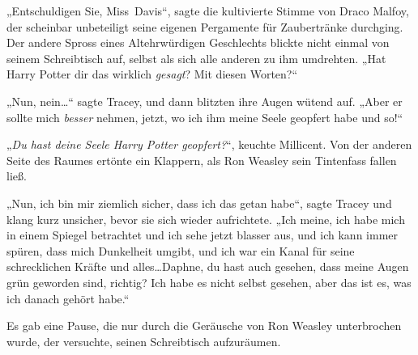 „Entschuldigen Sie, Miss~Davis“, sagte die kultivierte Stimme von Draco Malfoy, der scheinbar unbeteiligt seine eigenen Pergamente für Zaubertränke durchging. Der andere Spross eines Altehrwürdigen Geschlechts blickte nicht einmal von seinem Schreibtisch auf, selbst als sich alle anderen zu ihm umdrehten. „Hat Harry Potter dir das wirklich \emph{gesagt}? Mit diesen Worten?“

„Nun, nein…“ sagte Tracey, und dann blitzten ihre Augen wütend auf. „Aber er sollte mich \emph{besser} nehmen, jetzt, wo ich ihm meine Seele geopfert habe und so!“

„\emph{Du hast deine Seele Harry Potter geopfert?}“, keuchte Millicent. Von der anderen Seite des Raumes ertönte ein Klappern, als Ron Weasley sein Tintenfass fallen ließ.

„Nun, ich bin mir ziemlich sicher, dass ich das getan habe“, sagte Tracey und klang kurz unsicher, bevor sie sich wieder aufrichtete. „Ich meine, ich habe mich in einem Spiegel betrachtet und ich sehe jetzt blasser aus, und ich kann immer spüren, dass mich Dunkelheit umgibt, und ich war ein Kanal für seine schrecklichen Kräfte und alles…Daphne, du hast auch gesehen, dass meine Augen grün geworden sind, richtig? Ich habe es nicht selbst gesehen, aber das ist es, was ich danach gehört habe.“

Es gab eine Pause, die nur durch die Geräusche von Ron Weasley unterbrochen wurde, der versuchte, seinen Schreibtisch aufzuräumen.

